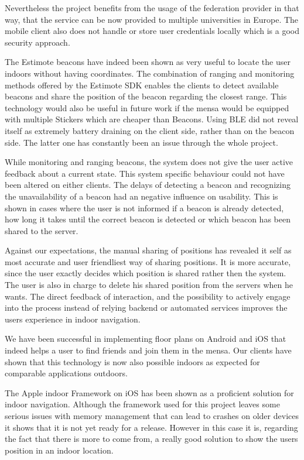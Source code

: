 Nevertheless the project benefits from the usage of the federation provider in that way, that the service can be now provided to multiple universities in Europe. The mobile client also does not handle or store user credentials locally which is a good security approach. 

The Estimote beacons have indeed been shown as very useful to locate the user indoors without having coordinates. The combination of ranging and monitoring methods offered by the Estimote SDK enables the clients to detect available beacons and share the position of the beacon regarding the closest range. This technology would also be useful in future work if the mensa would be equipped with multiple Stickers which are cheaper than Beacons. Using BLE did not reveal itself as extremely battery draining on the client side, rather than on the beacon side. The latter one has constantly been an issue through the whole project. 

While monitoring and ranging beacons, the system does not give the user active feedback about a current state. This system specific behaviour could not have been altered on either clients. The delays of detecting a beacon and recognizing the unavailability of a beacon had an negative influence on usability. This is shown in cases where the user is not informed if a beacon is already detected, how long it takes until the correct beacon is detected or which beacon has been shared to the server. 

Against our expectations, the manual sharing of positions has revealed it self as most accurate and user friendliest way of sharing positions. It is more accurate, since the user exactly decides which position is shared rather then the system. The user is also in charge to delete his shared position from the servers when he wants. The direct feedback of interaction, and the possibility to actively engage into the process instead of relying backend or automated services improves the users experience in indoor navigation. 

We have been successful in implementing floor plans on Android and iOS that indeed helps a user to find friends and join them in the mensa. Our clients have shown that this technology is now also possible indoors as expected for comparable applications outdoors. 

The Apple indoor Framework on iOS has been shown as a proficient solution for indoor navigation. Although the framework used for this project leaves some serious issues with memory management that can lead to crashes on older devices it shows that it is not yet ready for a release. However in this case it is, regarding the fact that there is more to come from, a really good solution to show the users position in an indoor location.

